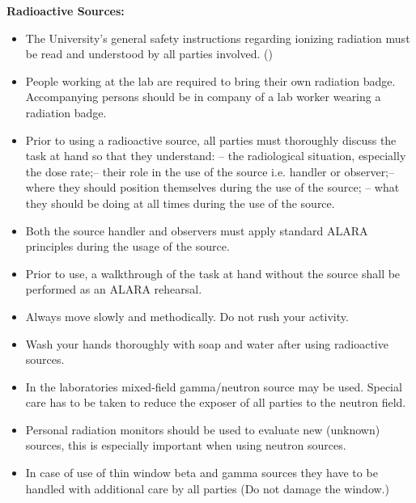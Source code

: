 \documentclass[11pt]{article}
\begin{document}
{\bf Radioactive Sources:}
\begin{itemize}
\item The University’s general safety instructions regarding ionizing
  radiation must be read and understood by all parties involved.
  ()
\item People working at the lab are required to bring their own
  radiation badge. Accompanying persons should be in company of a lab
  worker wearing a radiation badge.
\item Prior to using a radioactive source, all parties must thoroughly
  discuss the task at hand so that they understand: – the radiological
  situation, especially the dose rate;– their role in the use of the
  source i.e. handler or observer;– where they should position
  themselves during the use of the source; – what they should be doing
  at all times during the use of the source.
\item Both the source handler and observers must apply standard ALARA
  principles during the usage of the source.
\item Prior to use, a walkthrough of the task at hand without the
  source shall be performed as an ALARA rehearsal.
\item Always move slowly and methodically. Do not rush your activity.
\item Wash your hands thoroughly with soap and water after using
  radioactive sources.
\item In the laboratories mixed-field gamma/neutron source may be
  used.  Special care has to be taken to reduce the exposer of all
  parties to the neutron field.
\item Personal radiation monitors should be used to evaluate new
  (unknown) sources, this is especially important when using neutron
  sources.
\item In case of use of thin window beta and gamma sources they have
  to be handled with additional care by all parties (Do not damage
  the window.)
\end{itemize}
\end{document}
